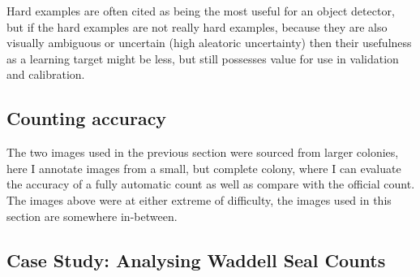 Hard examples are often cited as being the most useful for an object detector, but if the hard examples are not really hard examples, because they are also visually ambiguous or uncertain (high aleatoric uncertainty) then their usefulness as a learning target might be less, but still possesses value for use in validation and calibration.


\subsection{Counting accuracy}

The two images used in the previous section were sourced from larger colonies, here I annotate images from a small, but complete colony, where I can evaluate the accuracy of a fully automatic count as well as compare with the official count. The images above were at either extreme of difficulty, the images used in this section are somewhere in-between. 



\subsection{Case Study: Analysing Waddell Seal Counts}




